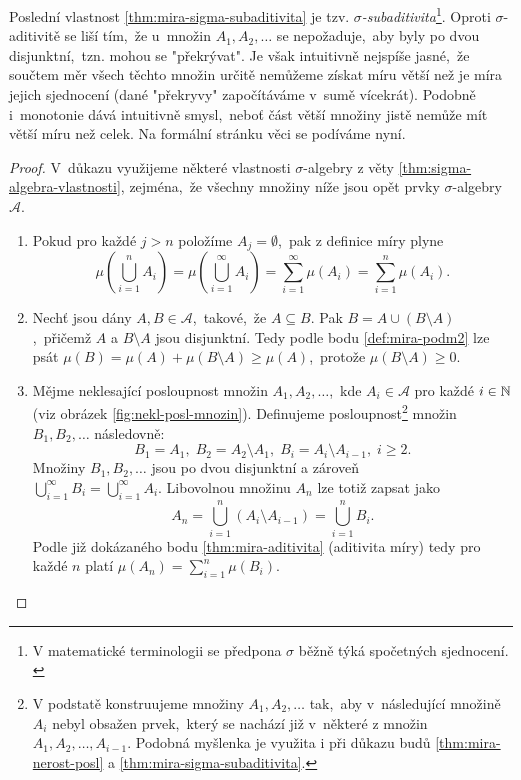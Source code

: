 Poslední vlastnost \ref{thm:mira-sigma-subaditivita} je tzv. \emph{$\sigma$-subaditivita}\footnote{V matematické terminologii se předpona $\sigma$ běžně týká spočetných sjednocení. \citep[str. 2]{Lukes2013}}. Oproti $\sigma$-aditivitě se liší tím,~že u~množin $A_1,A_2,\dots$ se nepožaduje,~aby byly po dvou disjunktní,~tzn. mohou se "překrývat". Je však intuitivně nejspíše jasné,~že součtem měr všech těchto množin určitě nemůžeme získat míru větší než je míra jejich sjednocení (dané "překryvy" započítáváme v~sumě vícekrát). Podobně i~monotonie dává intuitivně smysl,~neboť část větší množiny jistě nemůže mít větší míru než celek. Na formální stránku věci se podíváme nyní.
\begin{proof}
    V~důkazu využijeme některé vlastnosti $\sigma$-algebry z věty \ref{thm:sigma-algebra-vlastnosti}, zejména,~že všechny množiny níže jsou opět prvky $\sigma$-algebry~$\mathcal{A}$.
    \begin{enumerate}[label=\textit{(\roman*)}]
        \item Pokud pro každé $j>n$ položíme $A_j=\emptyset$,~pak z definice míry plyne
        \[\mu\left(\bigcup_{i=1}^n A_i\right)=\mu\left(\bigcup_{i=1}^\infty A_i\right)=\sum_{i=1}^{\infty}\mu(A_i)=\sum_{i=1}^{n}\mu(A_i).\]
        \item Nechť jsou dány $A,B\in\mathcal{A}$,~takové,~že $A\subseteq B$. Pak $B=A\cup(B\setminus A)$,~přičemž $A$ a $B\setminus A$ jsou disjunktní. Tedy podle bodu \ref{def:mira-podm2} lze psát $\mu(B)=\mu(A)+\mu(B\setminus A)\geqslant\mu(A)$,~protože $\mu(B\setminus A)\geqslant 0$.
        \item Mějme neklesající posloupnost množin $A_1,A_2,\ldots$,~kde $A_i\in\mathcal{A}$ pro každé $i\in\mathbb{N}$ (viz obrázek \ref{fig:nekl-posl-mnozin}).
        Definujeme posloupnost\footnote{V podstatě konstruujeme množiny $A_1,A_2,\ldots$ tak,~aby v~následující množině $A_i$ nebyl obsažen prvek,~který se nachází již v~některé z množin $A_1,A_2,\ldots,A_{i-1}$. Podobná myšlenka je využita i při důkazu budů \ref{thm:mira-nerost-posl} a \ref{thm:mira-sigma-subaditivita}.} množin $B_1,B_2,\ldots$ následovně:
        \[B_1=A_1,\;B_2=A_2\setminus A_1,\;B_i=A_i\setminus A_{i-1},\;i\geqslant 2.\]
        Množiny $B_1,B_2,\dots$ jsou po dvou disjunktní a zároveň\\$\bigcup_{i=1}^\infty B_i=\bigcup_{i=1}^\infty A_i$. Libovolnou množinu $A_n$ lze totiž zapsat jako
        \[A_n=\bigcup_{i=1}^n (A_i\setminus A_{i-1})=\bigcup_{i=1}^n B_i.\] 
        Podle již dokázaného bodu \ref{thm:mira-aditivita} (aditivita míry) tedy pro každé $n$ platí $\mu(A_n)=\sum_{i=1}^{n}\mu(B_i)$.

\end{enumerate}
\end{proof}
